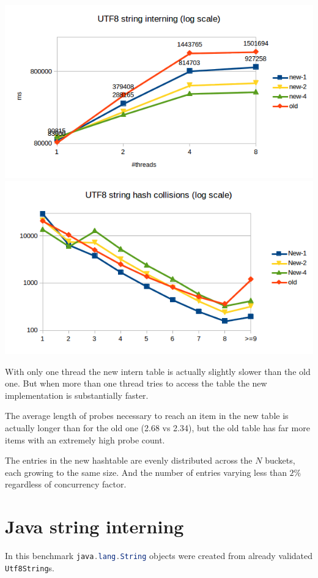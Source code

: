 \documentclass[12pt,a4paper,oneside]{article}
\newcommand{\cpp}[1]{\lstinline[language=C++]{#1}}
\newcommand{\java}[1]{\lstinline[language=Java]{#1}}
\begin{document}
	\includegraphics{utf8-intern-time.png}
	\includegraphics{utf8-intern-collisions.png}

	With only one thread the new intern table is actually slightly slower than the old one.
	But when more than one thread tries to access the table the new implementation is substantially faster.

	The average length of probes necessary to reach an item in the new table is actually longer than for the old
	one (2.68 vs 2.34), but the old table has far more items with an extremely high probe count.

	The entries in the new hashtable are evenly distributed across the $N$ buckets, each growing to the same size.
	And the number of entries varying less than $2\%$ regardless of concurrency factor.

\section{Java string interning}
	In this benchmark \java{java.lang.String} objects were created from already validated \cpp{Utf8String}s.
\end{document}
